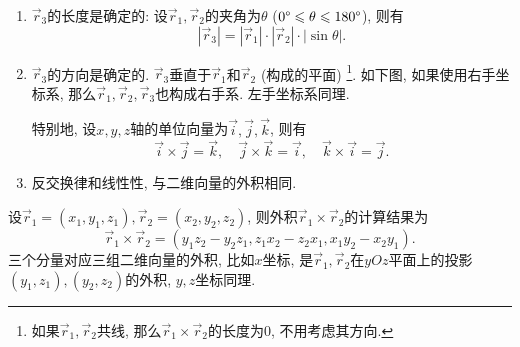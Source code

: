 \begin{enumerate}
  \item $\vec r_3$的长度是确定的:
        设$\vec r_1,\vec r_2$的夹角为$\theta$
        ($0\degree \leqslant \theta \leqslant 180\degree$), 则有
        \[
          |\vec r_3| = |\vec r_1|\cdot|\vec r_2|\cdot|\sin\theta|.
        \]
  \item $\vec r_3$的方向是确定的.
        $\vec r_3$垂直于$\vec r_1$和$\vec r_2$ (构成的平面)
        \footnote{
          如果$\vec r_1,\vec r_2$共线,
          那么$\vec r_1\times\vec r_2$的长度为0,
          不用考虑其方向.
        }.
        如下图, 如果使用右手坐标系,
        那么$\vec r_1,\vec r_2,\vec r_3$也构成右手系.
        左手坐标系同理.

        \begin{center}
        \end{center}

        特别地, 设$x,y,z$轴的单位向量为$\vec i,\vec j,\vec k$, 则有
        \[
          \vec i\times\vec j = \vec k,\quad
          \vec j\times\vec k = \vec i,\quad
          \vec k\times\vec i = \vec j.
        \]
  \item 反交换律和线性性, 与二维向量的外积相同.
\end{enumerate}

设$\vec r_1=(x_1,y_1,z_1),\vec r_2=(x_2,y_2,z_2)$,
则外积$\vec r_1\times\vec r_2$的计算结果为
\[
  \vec r_1\times\vec r_2 =
  (y_1z_2 - y_2z_1, z_1x_2 - z_2x_1, x_1y_2 - x_2y_1).
\]
三个分量对应三组二维向量的外积, 比如$x$坐标,
是$\vec r_1,\vec r_2$在$yOz$平面上的投影
$(y_1,z_1),(y_2,z_2)$的外积, $y,z$坐标同理.
